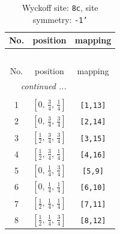 \documentclass[fleqn,8pt]{jsarticle}
\begin{document}
\renewcommand{\arraystretch}{1.2}
\begin{longtable}{ccc}
\caption{Wyckoff site: {\tt 8c}, site symmetry: {\tt -1'}}
 \\
 \hline \hline
No. & position & mapping \\ \hline \endfirsthead

\multicolumn{2}{l}{\tablename\ \thetable{}} \\
 \hline \hline
No. & position & mapping \\ \hline \endhead

 \hline \hline
\multicolumn{2}{r}{\footnotesize\it continued ...} \\ \endfoot

 \hline \hline
\multicolumn{2}{r}{} \\ \endlastfoot

1 & $\left[ 0,\, \frac{3}{4},\, \frac{1}{4} \right]$ & {\tt [1,13]} \\ \hline
2 & $\left[ 0,\, \frac{3}{4},\, \frac{3}{4} \right]$ & {\tt [2,14]} \\ \hline
3 & $\left[ \frac{1}{2},\, \frac{3}{4},\, \frac{3}{4} \right]$ & {\tt [3,15]} \\ \hline
4 & $\left[ \frac{1}{2},\, \frac{3}{4},\, \frac{1}{4} \right]$ & {\tt [4,16]} \\ \hline
5 & $\left[ 0,\, \frac{1}{4},\, \frac{3}{4} \right]$ & {\tt [5,9]} \\ \hline
6 & $\left[ 0,\, \frac{1}{4},\, \frac{1}{4} \right]$ & {\tt [6,10]} \\ \hline
7 & $\left[ \frac{1}{2},\, \frac{1}{4},\, \frac{1}{4} \right]$ & {\tt [7,11]} \\ \hline
8 & $\left[ \frac{1}{2},\, \frac{1}{4},\, \frac{3}{4} \right]$ & {\tt [8,12]} \\
\end{longtable}
\renewcommand{\arraystretch}{1.2}
\end{document}
